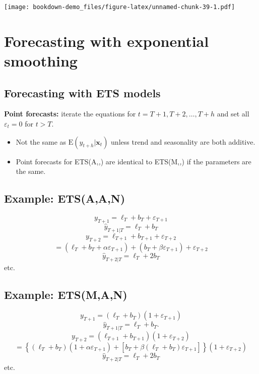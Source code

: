 \documentclass[]{book}
\providecommand{\tightlist}{%
  \setlength{\itemsep}{0pt}\setlength{\parskip}{0pt}}
\begin{document}
\texttt{[image: bookdown-demo\_files/figure-latex/unnamed-chunk-39-1.pdf]}

\hypertarget{forecasting-with-exponential-smoothing}{%
\section{Forecasting with exponential smoothing}\label{forecasting-with-exponential-smoothing}}

\hypertarget{forecasting-with-ets-models}{%
\subsection{Forecasting with ETS models}\label{forecasting-with-ets-models}}

\textbf{Point forecasts:} iterate the equations for \(t=T+1,T+2,\dots,T+h\) and set all \(\varepsilon_t=0\) for \(t>T\).

\begin{itemize}
\tightlist
\item
  Not the same as \(\text{E}(y_{t+h} | \mathbf{x}_t)\) unless trend and seasonality are both additive.
\item
  Point forecasts for ETS(A,\emph{,}) are identical to ETS(M,\emph{,}) if the parameters are the same.
\end{itemize}

\hypertarget{example-etsaan}{%
\subsection{Example: ETS(A,A,N)}\label{example-etsaan}}

\[y_{T+1} = \ell_T + b_T  + \varepsilon_{T+1}\]
\[\hat{y}_{T+1|T} = \ell_{T}+b_{T}\]
\[y_{T+2}       = \ell_{T+1} + b_{T+1} + \varepsilon_{T+2}\]
\[=
                      (\ell_T + b_T + \alpha\varepsilon_{T+1}) +
                      (b_T + \beta \varepsilon_{T+1}) +
        \varepsilon_{T+2}\]
\[\hat{y}_{T+2|T} = \ell_{T}+2b_{T}\]
etc.

\hypertarget{example-etsman}{%
\subsection{Example: ETS(M,A,N)}\label{example-etsman}}

\[y_{T+1} = (\ell_T + b_T )(1+ \varepsilon_{T+1})\]
\[\hat{y}_{T+1|T} = \ell_{T}+b_{T}.\]
\[y_{T+2}         = (\ell_{T+1} + b_{T+1})(1 + \varepsilon_{T+2})\]
\[= \left\{
                    (\ell_T + b_T) (1+ \alpha\varepsilon_{T+1}) +
                    \left[b_T + \beta (\ell_T + b_T)\varepsilon_{T+1}\right]
                    \right\}
                   (1 + \varepsilon_{T+2})\]
\[\hat{y}_{T+2|T} = \ell_{T}+2b_{T}\]
etc.
\end{document}
